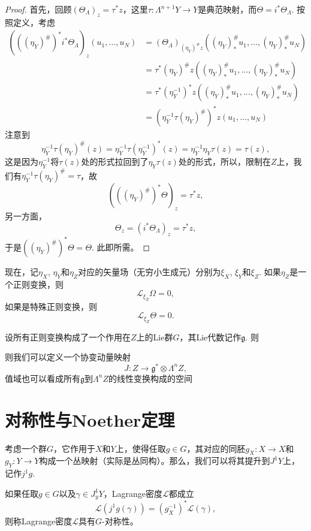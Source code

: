\begin{proof}
    首先，回顾$(\Theta_\Lambda)_z=\tau^*z$，这里$\tau:\Lambda^{n+1}Y\to Y$是典范映射，而$\Theta=i^*\Theta_\Lambda$. 按照定义，考虑
    \begin{align*}
        (((\eta_Y)^\#)^*i^*\Theta_\Lambda)_z(u_1,\dots,u_N)&=(\Theta_\Lambda)_{(\eta_Y)^\#z}((\eta_Y)^\#_{*}u_1,\dots,(\eta_Y)^\#_{*}u_N)\\
        &=\tau^* (\eta_Y)^\# z((\eta_Y)^\#_{*}u_1,\dots,(\eta_Y)^\#_{*}u_N)\\ 
        &=\tau^*(\eta_Y^{-1})^*z((\eta_Y)^\#_{*}u_1,\dots,(\eta_Y)^\#_{*}u_N)\\ 
        &=\left(\eta_Y^{-1}\tau(\eta_Y)^\#\right)^*z(u_1,\dots,u_N)
    \end{align*}
    注意到
    \[
        \eta_Y^{-1}\tau(\eta_Y)^\#(z) = \eta_Y^{-1}\tau(\eta_Y^{-1})^*(z) = \eta_Y^{-1}\eta_Y\tau(z)=\tau(z),
    \]
    这是因为$\eta_Y^{-1}$将$\tau(z)$处的形式拉回到了$\eta_Y\tau(z)$处的形式，所以，限制在$Z$上，我们有$\eta_Y^{-1}\tau(\eta_Y)^\#=\tau$，故
    \[
        \left(((\eta_Y)^\#)^*\Theta\right)_z=\tau^*z,
    \]
    另一方面，
    \[
        \Theta_z=(i^*\Theta_\Lambda)_z=\tau^*z,
    \]
    于是$((\eta_Y)^\#)^*\Theta=\Theta$. 此即所需。
\end{proof}

现在，记$\eta_X$, $\eta_Y$和$\eta_Z$对应的矢量场（无穷小生成元）分别为$\xi_X$, $\xi_Y$和$\xi_Z$. 如果$\eta_Z$是一个正则变换，则
\[
    \mathscr L_{\xi_Z}\Omega=0,
\]
如果是特殊正则变换，则
\[
    \mathscr L_{\xi_Z}\Theta=0.
\]

\begin{para}[协变动量映射]
    设所有正则变换构成了一个作用在$Z$上的Lie群$G$，其Lie代数记作$\mathfrak g$. 则
    
    则我们可以定义一个协变动量映射
    \[
        J:Z\to \mathfrak g^*\otimes \Lambda^n Z,
    \]
    值域也可以看成所有$\mathfrak g$到$\Lambda^n Z$的线性变换构成的空间
\end{para}

\section{对称性与Noether定理}

考虑一个群$G$，它作用于$X$和$Y$上，使得任取$g\in G$，其对应的同胚$g_X:X\to X$和$g_Y:Y\to Y$构成一个丛映射（实际是丛同构）。那么，我们可以将其提升到$J^1Y$上，记作$j^1g$. 

\begin{para}[Lagrange密度的对称性]
    如果任取$g\in G$以及$\gamma\in J_y^1 Y$，Lagrange密度$\mathcal L$都成立
    \[
        \mathcal L(j^1g(\gamma))=(g_X^{-1})^*\mathcal L(\gamma),
    \]
    则称Lagrange密度$\mathcal L$具有$G$-对称性。
\end{para}

